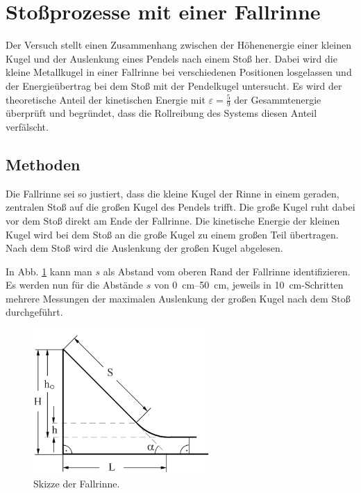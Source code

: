 \section{Stoßprozesse mit einer Fallrinne}
Der Versuch stellt einen Zusammenhang zwischen der Höhenenergie einer kleinen Kugel und der Auslenkung eines Pendels nach einem Stoß her.
Dabei wird die kleine Metallkugel in einer Fallrinne bei verschiedenen Positionen losgelassen und der Energieübertrag bei dem Stoß mit der Pendelkugel untersucht.
Es wird der theoretische Anteil der kinetischen Energie mit $\varepsilon = \frac{5}{9}$ der Gesammtenergie überprüft und begründet, dass die Rollreibung des Systems diesen Anteil verfälscht.

	\subsection{Methoden}
	Die Fallrinne sei so justiert, dass die kleine Kugel der Rinne in einem geraden, zentralen Stoß auf die großen Kugel des Pendels trifft.
	Die große Kugel ruht dabei vor dem Stoß direkt am Ende der Fallrinne.
	Die kinetische Energie der kleinen Kugel wird bei dem Stoß an die große Kugel zu einem großen Teil übertragen.
	Nach dem Stoß wird die Auslenkung der großen Kugel abgelesen.
	
	In Abb. \ref{fig:fallrinneSkizze} kann man $s$ als Abstand vom oberen Rand der Fallrinne identifizieren.
	Es werden nun für die Abstände $s$ von \SIrange{0}{50}{\centi\meter}, jeweils in \SI{10}{\centi\meter}-Schritten mehrere Messungen der maximalen Auslenkung der großen Kugel nach dem Stoß durchgeführt.
	
	\begin{figure}[ht]
		\centering
		\includegraphics[width=0.6\textwidth]{FallrinneSkizze.png}
		\caption{Skizze der Fallrinne.}
		\label{fig:fallrinneSkizze}	
	\end{figure}

